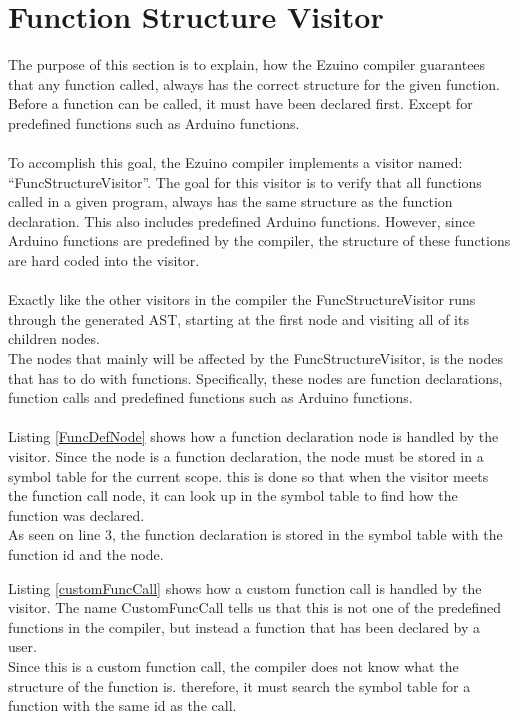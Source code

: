 \section{Function Structure Visitor}
The purpose of this section is to explain, how the Ezuino compiler guarantees that any function called, always has the correct structure for the given function. Before a function can be called, it must have been declared first. Except for predefined functions such as Arduino functions.
\\\\
To accomplish this goal, the Ezuino compiler implements a visitor named: “FuncStructureVisitor”. The goal for this visitor is to verify that all functions called in a given program, always has the same structure as the function declaration. This also includes predefined Arduino functions. However, since Arduino functions are predefined by the compiler, the structure of these functions are hard coded into the visitor.
\\\\
Exactly like the other visitors in the compiler the FuncStructureVisitor runs through the generated AST, starting at the first node and visiting all of its children nodes.\\
The nodes that mainly will be affected by the FuncStructureVisitor, is the nodes that has to do with functions. Specifically, these nodes are function declarations, function calls and predefined functions such as Arduino functions.
\\\\
Listing \ref{FuncDefNode} shows how a function declaration node is handled by the visitor. Since the node is a function declaration, the node must be stored in a symbol table for the current scope. this is done so that when the visitor meets the function call node, it can look up in the symbol table to find how the function was declared.\\
As seen on line 3, the function declaration is stored in the symbol table with the function id and the node.

\noindent\newline
Listing \ref{customFuncCall} shows how a custom function call is handled by the visitor. The name CustomFuncCall tells us that this is not one of the predefined functions in the compiler, but instead a function that has been declared by a user.\\
Since this is a custom function call, the compiler does not know what the structure of the function is. therefore, it must search the symbol table for a function with the same id as the call.\\
